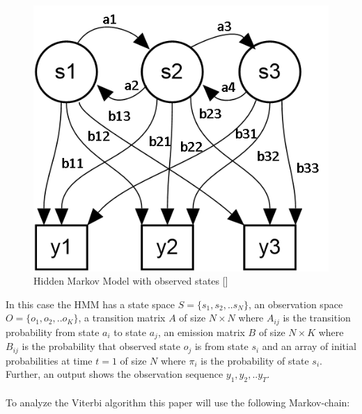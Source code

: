 \documentclass[12pt,journal,compsoc]{IEEEtran}
\begin{document}
\begin{figure}[ht]
	\centering
  	\includegraphics[scale=0.65]{figures/fif1_HMM.png}
	\caption{Hidden Markov Model with observed states []}
	\label{fig1}
\end{figure}

In this case the HMM has a state space $S = \{s_1, s_2, .. s_N\}$, an observation space $O=\{o_1, o_2,.. o_K\}$, a transition matrix $A$ of size $N{\times}N$ where $A_{ij}$ is the transition probability from state $a_i$ to state $a_j$, an emission matrix $B$ of size $N{\times}K$ where $B_{ij}$ is the probability that observed state $o_j$ is from state $s_i$ and an array of initial probabilities at time $t=1$ of size $N$ where $\pi_i$ is the probability of state $s_i$. Further, an output shows the observation sequence $y_1, y_2, .. y_T$. \\
\\
To analyze the Viterbi algorithm this paper will use the following Markov-chain:
\end{document}
